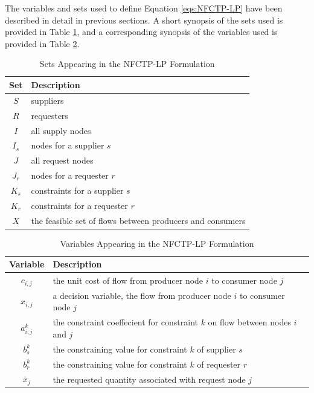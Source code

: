 The variables and sets used to define Equation \ref{eqs:NFCTP-LP} have been
described in detail in previous sections. A short synopsis of the sets used is
provided in Table \ref{tbl:NFCTP-LP-sets}, and a corresponding synopsis of the
variables used is provided in Table \ref{tbl:NFCTP-LP-vars}.

\begin{table} [h!]
\centering
\begin{tabularx}{\columnwidth-10pt}{|c|X|} %
\hline
Set         & Description \\
\hline
$S$     & suppliers \\
$R$     & requesters \\
$I$     & all supply nodes \\
$I_s$   & nodes for a supplier $s$ \\
$J$     & all request nodes \\
$J_r$   & nodes for a requester $r$ \\
$K_s$   & constraints for a supplier $s$ \\
$K_r$   & constraints for a requester $r$ \\
$X$         & the feasible set of flows between producers and consumers  \\
\hline
\end{tabularx}
\caption{Sets Appearing in the NFCTP-LP Formulation}
\label{tbl:NFCTP-LP-sets}
\end{table}

\begin{table} [h!]
\centering
\begin{tabularx}{\columnwidth-10pt}{|c|X|} %
\hline
Variable    & Description \\
\hline
$c_{i,j}$             & the unit cost of flow
                          from producer node $i$ to consumer node $j$  \\
$x_{i,j}$             & a decision variable, the flow 
                          from producer node $i$ to consumer node $j$  \\
$a_{i,j}^k$ & the constraint coeffecient for constraint $k$ 
                          on flow between nodes $i$ and $j$  \\
$b_s^k$   & the constraining value for constraint $k$ of supplier $s$ \\
$b_r^k$   & the constraining value for constraint $k$ of requester $r$ \\
$\tilde{x_j}$ & the requested quantity associated with request node $j$ \\
\hline
\end{tabularx}
\caption{Variables Appearing in the NFCTP-LP Formulation}
\label{tbl:NFCTP-LP-vars}
\end{table}

